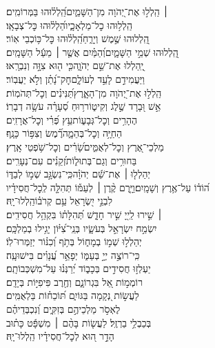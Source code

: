 \documentclass[twoside, openany, parskip=half, 11pt]{book}
\begin{document}
\begin{narrow}
 ׀ \hfill \break
הַֽלְל֣וּ אֶת־יְ֭הֹוָה מִן־הַשָּׁמַ֑יִם\hfill הַֽ֝לְל֗וּהוּ בַּמְּרוֹמִֽים׃\\
הַֽלְל֥וּהוּ כׇל־מַלְאָכָ֑יו\hfill הַ֝לְל֗וּהוּ כׇּל־צְבָאָֽו׃\\
הַֽ֭לְלוּהוּ שֶׁ֣מֶשׁ וְיָרֵ֑חַ\hfill הַֽ֝לְל֗וּהוּ כׇּל־כּ֥וֹכְבֵי אֽוֹר׃\\
הַֽ֭לְלוּהוּ שְׁמֵ֣י הַשָּׁמָ֑יִם\hfill וְ֝הַמַּ֗יִם אֲשֶׁ֤ר ׀ מֵעַ֬ל הַשָּׁמָֽיִם׃\\
יְֽ֭הַלְלוּ אֶת־שֵׁ֣ם יְהֹוָ֑ה\hfill כִּ֤י ה֖וּא צִוָּ֣ה וְנִבְרָֽאוּ׃\\
וַיַּעֲמִידֵ֣ם לָעַ֣ד לְעוֹלָ֑ם\hfill חׇק־נָ֝תַ֗ן וְלֹ֣א יַעֲבֽוֹר׃\\
הַֽלְל֣וּ אֶת־יְ֭הֹוָה מִן־הָאָ֑רֶץ\hfill תַּ֝נִּינִ֗ים וְכׇל־תְּהֹמֽוֹת׃\\
אֵ֣שׁ וּ֭בָרָד שֶׁ֣לֶג וְקִיט֑וֹר\hfill ר֥וּחַ סְ֝עָרָ֗ה עֹשָׂ֥ה דְבָרֽוֹ׃\\
הֶהָרִ֥ים וְכׇל־גְּבָע֑וֹת\hfill עֵ֥ץ פְּ֝רִ֗י וְכׇל־אֲרָזִֽים׃\\
הַחַיָּ֥ה וְכׇל־בְּהֵמָ֑ה\hfill רֶ֗֝מֶשׂ וְצִפּ֥וֹר כָּנָֽף׃\\
מַלְכֵי־אֶ֭רֶץ וְכׇל־לְאֻמִּ֑ים\hfill שָׂ֝רִ֗ים וְכׇל־שֹׁ֥פְטֵי אָֽרֶץ׃\\
בַּחוּרִ֥ים וְגַם־בְּתוּל֑וֹת\hfill זְ֝קֵנִ֗ים עִם־נְעָרִֽים׃\\
יְהַלְל֤וּ ׀ אֶת־שֵׁ֬ם יְהֹוָ֗ה\hfill כִּֽי־נִשְׂגָּ֣ב שְׁמ֣וֹ לְבַדּ֑וֹ\\
ה֝וֹד֗וֹ עַל־אֶ֥רֶץ וְשָׁמָֽיִם׃\hfill וַיָּ֤רֶם קֶ֨רֶן ׀ לְעַמּ֡וֹ תְּהִלָּ֤ה לְֽכׇל־חֲסִידָ֗יו\\
לִבְנֵ֣י יִ֭שְׂרָאֵל עַ֥ם קְרֹב֗וֹ\hfill הַֽלְלוּ־יָֽהּ׃\\  
 ׀ \hfill \break
 שִׁ֣ירוּ לַֽייָ֭ שִׁ֣יר חָדָ֑שׁ \hfill תְּ֝הִלָּת֗וֹ בִּקְהַ֥ל חֲסִידִֽים׃ \\
 יִשְׂמַ֣ח יִשְׂרָאֵ֣ל בְּעֹשָׂ֑יו \hfill בְּנֵֽי־צִ֝יּ֗וֹן יָגִ֥ילוּ בְמַלְכָּֽם׃ \\
 יְהַלְל֣וּ שְׁמ֣וֹ בְמָח֑וֹל \hfill בְּתֹ֥ף וְ֝כִנּ֗וֹר יְזַמְּרוּ־לֽוֹ׃ \\
 כִּֽי־רוֹצֶ֣ה יְיָ֣ בְּעַמּ֑וֹ \hfill יְפָאֵ֥ר עֲ֝נָוִ֗ים בִּישׁוּעָֽה׃ \\
 יַעְלְז֣וּ חֲסִידִ֣ים בְּכָב֑וֹד \hfill יְ֝רַנְּנ֗וּ עַל־מִשְׁכְּבוֹתָֽם׃ \\
 רוֹמְמ֣וֹת אֵ֭ל בִּגְרוֹנָ֑ם \hfill וְחֶ֖רֶב פִּיפִיּ֣וֹת בְּיָדָֽם׃ \\
 לַעֲשׂ֣וֹת נְ֭קָמָה בַּגּוֹיִ֑ם \hfill תּ֝וֹכֵח֗וֹת בַּלְאֻמִּֽים׃ \\
 לֶאְסֹ֣ר מַלְכֵיהֶ֣ם בְּזִקִּ֑ים \hfill וְ֝נִכְבְּדֵיהֶ֗ם\\ בְּכַבְלֵ֥י בַרְזֶֽל׃ \hfill
 לַעֲשׂ֤וֹת בָּהֶ֨ם ׀ מִשְׁפָּ֬ט כָּת֗וּב\\ הָדָ֣ר ה֭וּא לְכׇל־חֲסִידָ֗יו \hfill הַֽלְלוּ־יָֽהּ׃ \\
 

\end{narrow}
\end{document}
